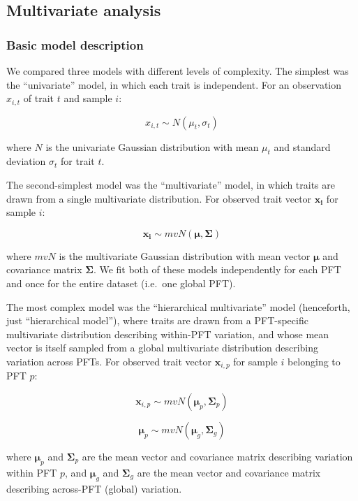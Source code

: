 \documentclass{article}
\begin{document}
\subsection{Multivariate analysis}

\subsubsection{Basic model description}

We compared three models with different levels of complexity.
The simplest was the ``univariate'' model, in which each trait is independent.
For an observation $x_{i,t}$ of trait $t$ and sample $i$:

\begin{equation}
x_{i,t} \sim N(\mu_t, \sigma_t)
\end{equation}

where $N$ is the univariate Gaussian distribution with mean $\mu_t$ and standard deviation $\sigma_t$ for trait $t$.

The second-simplest model was the ``multivariate'' model, in which traits are drawn from a single multivariate distribution.
For observed trait vector ${\bm{x_i}}$ for sample $i$:

\begin{equation}
\bm{x_i} \sim mvN(\bm{\mu}, \bm{\Sigma})
\end{equation}

where $mvN$ is the multivariate Gaussian distribution with mean vector $\bm{\mu}$ and covariance matrix $\bm{\Sigma}$.
We fit both of these models independently for each PFT and once for the entire dataset (i.e.\ one global PFT).

The most complex model was the ``hierarchical multivariate'' model (henceforth, just ``hierarchical model''),
where traits are drawn from a PFT-specific multivariate distribution describing within-PFT variation,
and whose mean vector is itself sampled from a global multivariate distribution describing variation across PFTs.
For observed trait vector $\bm{x}_{i,p}$ for sample $i$ belonging to PFT $p$:

\begin{equation}
\bm{x}_{i,p} \sim mvN(\bm{\mu}_p, \bm{\Sigma}_p)
\end{equation}

\begin{equation}
\bm{\mu}_p \sim mvN(\bm{\mu}_g, \bm{\Sigma}_g)
\end{equation}

where $\bm{\mu}_p$ and $\bm{\Sigma}_p$ are the mean vector and covariance matrix describing variation within PFT $p$, and $\bm{\mu}_g$ and $\bm{\Sigma}_g$ are the mean vector and covariance matrix describing across-PFT (global) variation.
\end{document}
